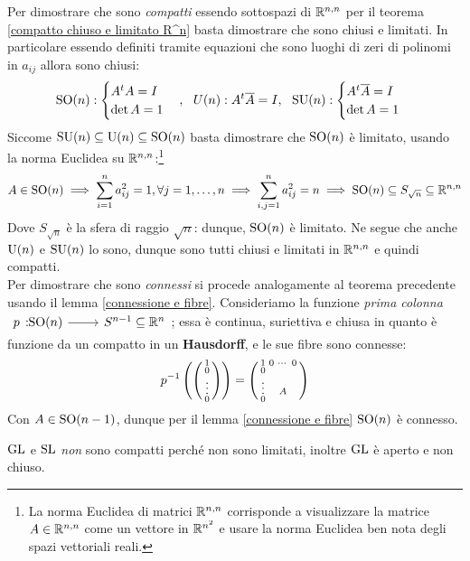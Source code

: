 \begin{theorema}
\end{theorema}
\begin{demonstration}
	Per dimostrare che sono \textit{compatti} essendo sottospazi di $\mathbb{R}^{n,n}$ per il teorema \ref{compatto chiuso e limitato R^n} basta dimostrare che sono chiusi e limitati. In particolare essendo definiti tramite equazioni che sono luoghi di zeri di polinomi in $a_{ij}$ allora sono chiusi:
		\begin{gather*}
			\operatorname{SO}(n):\begin{cases}
					A^{t}A=I\\
					\det A=1
				\end{cases}, \ \
			U(n): A^{t}\overline{A}=I, \ \
			\operatorname{SU}(n): \begin{cases}
				A^{t}\overline{A}=I\\
				\det A=1
			\end{cases}
		\end{gather*}
	Siccome $\operatorname{SU}(n)\subseteq \operatorname{U}(n)\subseteq \operatorname{SO}(n)$ basta dimostrare che $\operatorname{SO}(n)$ è limitato, usando la norma Euclidea su $\mathbb{R}^{n,n}$:\footnote{La norma Euclidea di matrici $\mathbb{R}^{n,n}$ corrisponde a visualizzare la matrice $A\in\mathbb{R}^{n,n}$ come un vettore in $\mathbb{R}^{n^2}$ e usare la norma Euclidea ben nota degli spazi vettoriali reali.}
		\begin{gather*}
			A\in\operatorname{SO}(n) \implies \sum_{i=1}^n a_{ij}^2=1, \forall j=1,\dots,n \implies \sum_{i,j=1}^n a_{ij}^2=n \implies \operatorname{SO}(n)\subseteq S_{\sqrt{n}}\subseteq\mathbb{R}^{n,n}
		\end{gather*}
	Dove $S_{\sqrt{n}}$ è la sfera di raggio $\sqrt{n}$: dunque, $\operatorname{SO}(n)$ è limitato. Ne segue che anche $\operatorname{U}(n)$ e $\operatorname{SU}(n)$ lo sono, dunque sono tutti chiusi e limitati in $\mathbb{R}^{n,n}$ e quindi compatti.\\
	Per dimostrare che sono \textit{connessi} si procede analogamente al teorema precedente usando il lemma \ref{connessione e fibre}. Consideriamo la funzione \textit{prima colonna} $\funz p {\So(n)} {S^{n-1}\subseteq \realset^n}$; essa è continua, suriettiva e chiusa in quanto è funzione da un compatto in un \textbf{Hausdorff}, e le sue fibre sono connesse:
	\begin{equation*}
		p^{-1}\left( \begin{psmallmatrix} 1 \\ 0 \\ \vdots \\ 0 \end{psmallmatrix} \right) = \begin{psmallmatrix}
			1      & 0 & \cdots & 0\\
			0      &   &       &  \\
			\vdots &   & A     &  \\
			0      &   &       &
		\end{psmallmatrix}
	\end{equation*}
Con $A\in \operatorname{SO}(n-1)$, dunque per il lemma \ref{connessione e fibre} $\operatorname{SO}(n)$ è connesso.
\end{demonstration}

\begin{observe}
	$\operatorname{GL}$ e $\operatorname{SL}$ \textit{non} sono compatti perché non sono limitati, inoltre $\operatorname{GL}$ è aperto e non chiuso.
\end{observe}
